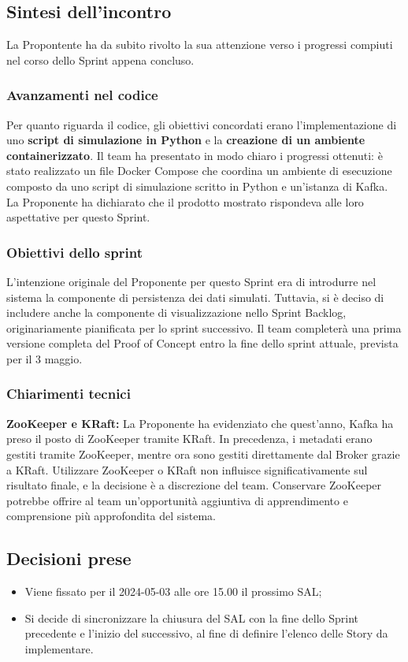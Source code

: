 \documentclass[8pt]{article}
\begin{document}
\subsection{Sintesi dell'incontro}
La Propontente ha da subito rivolto la sua attenzione verso i progressi compiuti nel corso dello Sprint appena concluso.
\subsubsection{Avanzamenti nel codice}
Per quanto riguarda il codice, gli obiettivi concordati erano l'implementazione di uno \textbf{script di simulazione in Python} e la \textbf{creazione di un ambiente containerizzato}. Il team ha presentato in modo chiaro i progressi ottenuti: è stato realizzato un file Docker Compose che coordina un ambiente di esecuzione composto da uno script di simulazione scritto in Python e un'istanza di Kafka. La Proponente ha dichiarato che il prodotto mostrato rispondeva alle loro aspettative per questo Sprint.
\subsubsection{Obiettivi dello sprint}
L'intenzione originale del Proponente per questo Sprint era di introdurre nel sistema la componente di persistenza dei dati simulati. Tuttavia, si è deciso di includere anche la componente di visualizzazione nello Sprint Backlog, originariamente pianificata per lo sprint successivo. Il team completerà una prima versione completa del Proof of Concept entro la fine dello sprint attuale, prevista per il 3 maggio. 
\subsubsection{Chiarimenti tecnici}
\textbf{ZooKeeper e KRaft:} La Proponente ha evidenziato che quest'anno, Kafka ha preso il posto di ZooKeeper tramite KRaft. In precedenza, i metadati erano gestiti tramite ZooKeeper, mentre ora sono gestiti direttamente dal Broker grazie a KRaft. Utilizzare ZooKeeper o KRaft non influisce significativamente sul risultato finale, e la decisione è a discrezione del team. Conservare ZooKeeper potrebbe offrire al team un'opportunità aggiuntiva di apprendimento e comprensione più approfondita del sistema.

\subsection{Decisioni prese}
\begin{itemize}
	\setlength\itemsep{0em}
	\item Viene fissato per il 2024-05-03 alle ore 15.00 il prossimo SAL;
	\item Si decide di sincronizzare la chiusura del SAL con la fine dello Sprint precedente e l'inizio del successivo, al fine di definire l'elenco delle Story da implementare.
\end{itemize}
\end{document}
